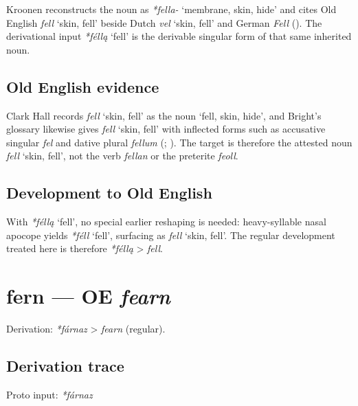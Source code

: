 \documentclass[
  british,
  a4paper,
  openany]{book}
\providecommand{\Recon}[1]{\emph{*#1}}
{\catcode`→=\active \global\def→{\ensuremath{\rightarrow}}}
\providecommand{\texorpdfstring}[2]{#1}
\providecommand{\Recon}[1]{\emph{*#1}}
{\catcode`→=\active \global\def→{\ensuremath{\rightarrow}}}
\begin{document}
Kroonen reconstructs the noun as \emph{*fella-} `membrane, skin, hide'
and cites Old English {\emph{fell}} `skin, fell' beside Dutch
{\emph{vel}} `skin, fell' and German \emph{Fell}
(). The derivational input
\Recon{féllą} `fell' is the derivable singular form of that same
inherited noun.

\subsection{Old English evidence}\label{old-english-evidence-15}

Clark Hall records {\emph{fell}} `skin, fell' as the noun `fell, skin,
hide', and Bright's glossary likewise gives {\emph{fell}} `skin, fell'
with inflected forms such as accusative singular \emph{fel} and dative
plural \emph{fellum} (;
). The target is
therefore the attested noun {\emph{fell}} `skin, fell', not the verb
\emph{fellan} or the preterite \emph{feoll}.

\subsection{Development to Old
English}\label{development-to-old-english-15}

With \Recon{féllą} `fell', no special earlier reshaping is needed:
heavy-syllable nasal apocope yields \Recon{féll} `fell', surfacing as
{\emph{fell}} `skin, fell'. The regular development treated here is
therefore \emph{*féllą} \textgreater{} \emph{fell}.

\section{\texorpdfstring{fern --- OE
\emph{fearn}}{fern --- OE fearn}}\label{fern-oe-fearn}


Derivation: \emph{*fárnaz} \textgreater{} \emph{fearn} (regular).

\subsection{Derivation trace}\label{derivation-trace-16}

Proto input: \emph{*fárnaz}
\end{document}
